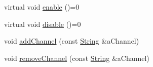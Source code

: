 \begin{DoxyCompactItemize}
\item 
virtual void \hyperlink{classostk_1_1core_1_1logger_1_1sinks_1_1_sink_a355c81571a4a34bb162c1dc5fe631c89}{enable} ()=0
\item 
virtual void \hyperlink{classostk_1_1core_1_1logger_1_1sinks_1_1_sink_a3e347ffee80e3c2ee50ff0edf9265115}{disable} ()=0
\item 
void \hyperlink{classostk_1_1core_1_1logger_1_1sinks_1_1_sink_a4f8fe98afdb070da6afde4c775e238ac}{add\+Channel} (const \hyperlink{classostk_1_1core_1_1types_1_1_string}{String} \&a\+Channel)
\item 
void \hyperlink{classostk_1_1core_1_1logger_1_1sinks_1_1_sink_a0cfd70c07a03a157b0810cc2a2c1f030}{remove\+Channel} (const \hyperlink{classostk_1_1core_1_1types_1_1_string}{String} \&a\+Channel)
\end{DoxyCompactItemize}
